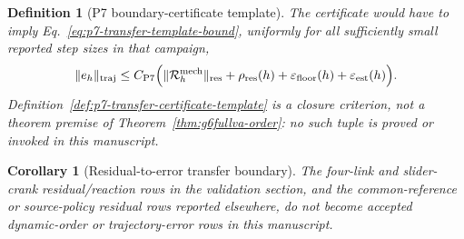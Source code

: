 \documentclass[preprint,12pt]{elsarticle}
\newtheorem{definition}{Definition}
\newtheorem{corollary}{Corollary}
\begin{document}
\begin{definition}[P7 boundary-certificate template]
The certificate would have to imply Eq.~\eqref{eq:p7-transfer-template-bound},
uniformly for all sufficiently small
reported step sizes in that campaign,
\begin{equation}
\label{eq:p7-transfer-template-bound}
  \|e_h\|_{\rm traj}
  \le C_{\rm P7}\Bigl(
     \|\mathcal R_h^{\rm mech}\|_{\rm res}
     +\rho_{\rm res}(h)
     +\varepsilon_{\rm floor}(h)
     +\varepsilon_{\rm est}(h)
  \Bigr).
\end{equation}
Definition~\ref{def:p7-transfer-certificate-template} is a closure criterion,
not a theorem premise of Theorem~\ref{thm:g6fullva-order}: no such tuple is
proved or invoked in this manuscript.
\end{definition}

\begin{corollary}[Residual-to-error transfer boundary]
The four-link and slider-crank residual/reaction rows in the validation
section, and the common-reference or source-policy residual rows reported
elsewhere, do not become accepted dynamic-order or trajectory-error rows in
this manuscript.
\end{corollary}
\end{document}
